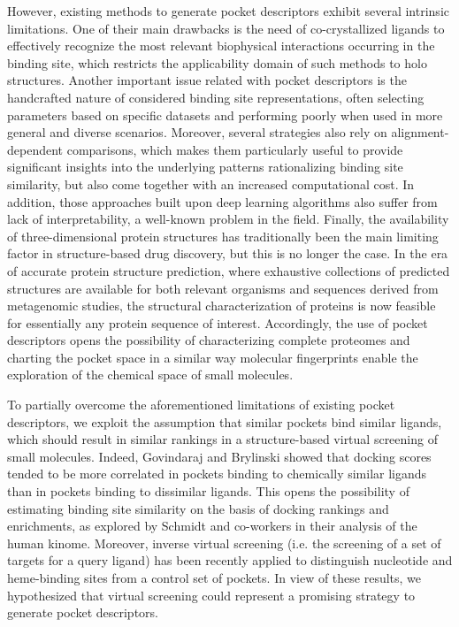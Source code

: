 However, existing methods to generate pocket descriptors exhibit several intrinsic limitations. One of their main drawbacks is the need of co-crystallized ligands to effectively recognize the most relevant biophysical interactions occurring in the binding site, which restricts the applicability domain of such methods to holo structures\cite{wood_pharmacophore_2012, desaphy_encoding_2013}. Another important issue related with pocket descriptors is the handcrafted nature of considered binding site representations, often selecting parameters based on specific datasets and performing poorly when used in more general and diverse scenarios\cite{ehrt_benchmark_2018}. Moreover, several strategies also rely on alignment-dependent comparisons, which makes them particularly useful to provide significant insights into the underlying patterns rationalizing binding site similarity, but also come together with an increased computational cost\cite{schalon_simple_2008}. In addition, those approaches built upon deep learning algorithms also suffer from lack of interpretability, a well-known problem in the field\cite{jimenez-luna_artificial_2021, vamathevan_applications_2019, ching_opportunities_2018}. Finally, the availability of three-dimensional protein structures has traditionally been the main limiting factor in structure-based drug discovery, but this is no longer the case. In the era of accurate protein structure prediction\cite{jumper_highly_2021, tunyasuvunakool_highly_2021, varadi_alphafold_2022}, where exhaustive collections of predicted structures are available for both relevant organisms\cite{david_alphafold_2022} and sequences derived from metagenomic studies\cite{lin_evolutionary-scale_2022}, the structural characterization of proteins is now feasible for essentially any protein sequence of interest. Accordingly, the use of pocket descriptors opens the possibility of characterizing complete proteomes and charting the pocket space in a similar way molecular fingerprints enable the exploration of the chemical space of small molecules\cite{lipinski_navigating_2004, willett_similarity-based_2006, capecchi_one_2020}.

To partially overcome the aforementioned limitations of existing pocket descriptors, we exploit the assumption that similar pockets bind similar ligands, which should result in similar rankings in a structure-based virtual screening of small molecules. Indeed, Govindaraj and Brylinski\cite{govindaraj_comparative_2018} showed that docking scores tended to be more correlated in pockets binding to chemically similar ligands than in pockets binding to dissimilar ligands. This opens the possibility of estimating binding site similarity on the basis of docking rankings and enrichments, as explored by Schmidt and co-workers in their analysis of the human kinome\cite{schmidt_analyzing_2021}. Moreover, inverse virtual screening (i.e. the screening of a set of targets for a query ligand) has been recently applied to distinguish nucleotide and heme-binding sites from a control set of pockets\cite{pu_deepdrug3d_2019}. In view of these results, we hypothesized that virtual screening could represent a promising strategy to generate pocket descriptors.

